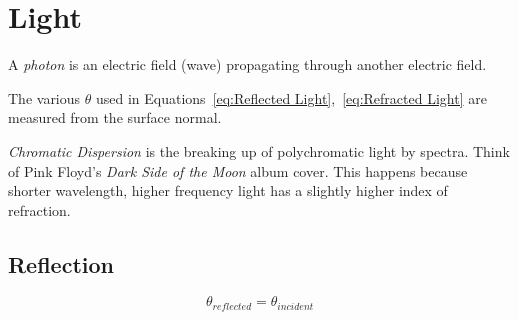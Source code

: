 \section{Light} \label{sec:Light}
	\begin{definition}[Photon]
		A \emph{photon} is an electric field (wave) propagating through another electric field.
	\end{definition}
The various $\theta$ used in Equations~\eqref{eq:Reflected Light},~\eqref{eq:Refracted Light} are measured from the surface normal.

\emph{Chromatic Dispersion} is the breaking up of polychromatic light by spectra.
Think of Pink Floyd's \textit{Dark Side of the Moon} album cover.
This happens because shorter wavelength, higher frequency light has a slightly higher index of refraction.

	\subsection{Reflection} \label{subsec:Reflection}
		\begin{equation} \label{eq:Reflected Light}
			\theta_{reflected} = \theta_{incident}
		\end{equation}
		
